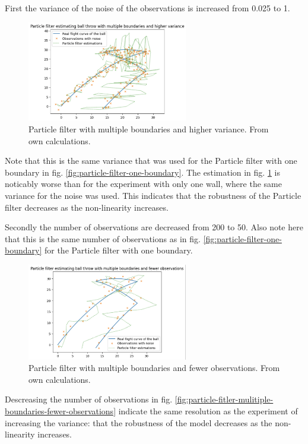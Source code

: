\documentclass[conference]{IEEEtran}
\begin{document}
First the variance of the noise of the observations is increased from 0.025 to 1.
\begin{figure}
	\centering
	\includegraphics[width=70mm]{figs/particle-filter-multiple-boundaries-higher-variance}
	\caption{Particle filter with multiple boundaries and higher variance. From own calculations.}
	\label{fig:particle-filter-multiple-boundaries-higher-variance}
\end{figure}
Note that this is the same variance that was used for the Particle filter with one boundary in fig. \ref{fig:particle-filter-one-boundary}.
The estimation in fig. \ref{fig:particle-filter-multiple-boundaries-higher-variance} is noticably worse than for the experiment with only one wall, where the same variance for the noise was used.
This indicates that the robustness of the Particle filter decreases as the non-linearity increases.

Secondly the number of observations are decreased from 200 to 50.
Also note here that this is the same number of observations as in fig. \ref{fig:particle-filter-one-boundary} for the Particle filter with one boundary.
\begin{figure}
	\centering
	\includegraphics[width=70mm]{figs/particle-filter-multiple-boundaries-fewer-observations}
	\caption{Particle filter with multiple boundaries and fewer observations. From own calculations.}
	\label{fig:particle-filter-multiple-boundaries-fewer-observations}
\end{figure}
Descreasing the number of observations in fig. \ref{fig:particle-fitler-mulitiple-boundaries-fewer-observations} indicate the same resolution as the experiment of increasing the variance: that the robustness of the model decreases as the non-linearity increases.
\end{document}
